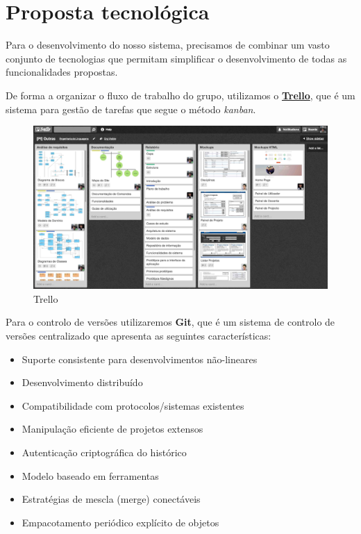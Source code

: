 \section{Proposta tecnológica}

Para o desenvolvimento do nosso sistema, precisamos de combinar um vasto conjunto de tecnologias que permitam 
simplificar o desenvolvimento de todas as funcionalidades propostas.

De forma a organizar o fluxo de trabalho do grupo, utilizamos o \href{https://trello.com/}{\textbf{Trello}}, 
que é um sistema para gestão de tarefas que segue o método \textit{kanban}.
\begin{figure}[H] 
  \centering
  \includegraphics[width=1\textwidth]{images/tecnologias/trello}
  \caption{Trello}
  \label{fig:trello}
\end{figure}

Para o controlo de versões utilizaremos \textbf{Git}, que é um sistema de controlo de versões 
centralizado que apresenta as seguintes características:

\begin{itemize}
  \item Suporte consistente para desenvolvimentos não-lineares
  \item Desenvolvimento distribuído
  \item Compatibilidade com protocolos/sistemas existentes
  \item Manipulação eficiente de projetos extensos  
  \item Autenticação criptográfica do histórico 
  \item Modelo baseado em ferramentas 
  \item Estratégias de mescla (merge) conectáveis
  \item Empacotamento periódico explícito de objetos  
\end{itemize}

